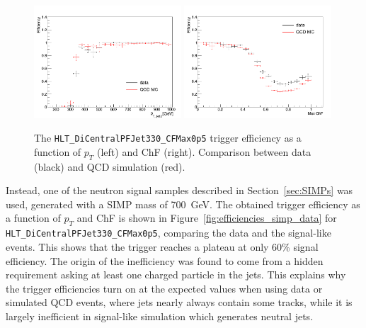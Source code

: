 \begin{figure}[ht]
  \centering
  \includegraphics[width=0.49\textwidth]{figures/trigger/pt_eff_05_DataMC.png}\hfill%
  \includegraphics[width=0.49\textwidth]{figures/trigger/chf_eff_05_DataMC.png}
  \caption{The \texttt{HLT\_DiCentralPFJet330\_CFMax0p5} trigger efficiency as a function of $p_{T}$ (left) and ChF (right). Comparison between data (black) and \ac{QCD} simulation (red). }
  \label{fig:efficiencies_qcd_data}
\end{figure}

Instead, one of the neutron signal samples described in Section~\ref{sec:SIMPs} was used, generated with a \ac{SIMP} mass of \SI{700}{GeV}. The obtained trigger efficiency as a function of $p_{T}$ and ChF is shown in Figure~\ref{fig:efficiencies_simp_data} for \texttt{HLT\_DiCentralPFJet330\_CFMax0p5}, comparing the data and the signal-like events. This shows that the trigger reaches a plateau at only 60\% signal efficiency. The origin of the inefficiency was found to come from a hidden requirement asking at least one charged particle in the jets. This explains why the trigger efficiencies turn on at the expected values when using data or simulated \ac{QCD} events, where jets nearly always contain some tracks, while it is largely inefficient in signal-like simulation which generates neutral jets.

